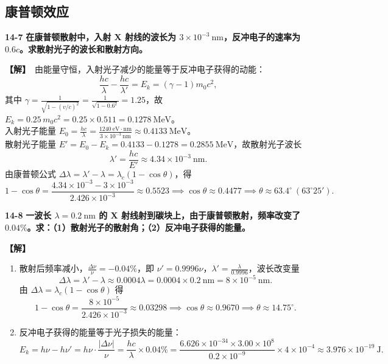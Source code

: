 \documentclass[zihao=5,a4paper,UTF8]{ctexart}
\newenvironment{prob}[2]{%
    \par\vspace{6pt}\noindent\textbf{\color{navy}#1} \textbf{#2}\par\nopagebreak\vspace{2pt}%
}{%
    \par\vspace{4pt}%
}
\newcommand{\sol}{\noindent\textbf{\color{tealaccent}【解】}\ }
\begin{document}
\subsection{康普顿效应}

\begin{prob}{14-7}{在康普顿散射中，入射 X 射线的波长为 $3\times 10^{-3}\ \mathrm{nm}$，反冲电子的速率为 $0.6c$。求散射光子的波长和散射方向。}
\sol 由能量守恒，入射光子减少的能量等于反冲电子获得的动能：
\[
    \frac{hc}{\lambda} - \frac{hc}{\lambda'} = E_k = (\gamma - 1)m_0 c^2,
\]
其中 $\gamma = \frac{1}{\sqrt{1 - (v/c)^2}} = \frac{1}{\sqrt{1 - 0.6^2}} = 1.25$，故 $E_k = 0.25\,m_0 c^2 = 0.25\times 0.511 = 0.1278\ \mathrm{MeV}$。\\
入射光子能量 $E_0 = \frac{hc}{\lambda} = \frac{1240\ \mathrm{eV\cdot nm}}{3\times 10^{-3}\ \mathrm{nm}} \approx 0.4133\ \mathrm{MeV}$。\\
散射光子能量 $E' = E_0 - E_k = 0.4133 - 0.1278 = 0.2855\ \mathrm{MeV}$，故散射光子波长
\[
    \lambda' = \frac{hc}{E'} \approx 4.34\times 10^{-3}\ \mathrm{nm}.
\]
由康普顿公式 $\Delta\lambda = \lambda' - \lambda = \lambda_c(1 - \cos\theta)$，得
\[
    1 - \cos\theta = \frac{4.34\times 10^{-3} - 3\times 10^{-3}}{2.426\times 10^{-3}} \approx 0.5523 \implies \cos\theta \approx 0.4477 \implies \theta \approx 63.4^\circ\ (63^\circ 25').
\]
\end{prob}

\begin{prob}{14-8}{一波长 $\lambda=0.2\ \mathrm{nm}$ 的 X 射线射到碳块上，由于康普顿散射，频率改变了 $0.04\%$。求：（1）散射光子的散射角；（2）反冲电子获得的能量。}
\sol
\begin{enumerate}[leftmargin=2em, itemsep=2pt]
    \item 散射后频率减小，$\frac{\Delta\nu}{\nu} = -0.04\%$，即 $\nu' = 0.9996\nu$，$\lambda' = \frac{\lambda}{0.9996}$，波长改变量
    \[
        \Delta\lambda = \lambda' - \lambda \approx 0.0004\lambda = 0.0004\times 0.2\ \mathrm{nm} = 8\times 10^{-5}\ \mathrm{nm}.
    \]
    由 $\Delta\lambda = \lambda_c(1 - \cos\theta)$ 得
    \[
        1 - \cos\theta = \frac{8\times 10^{-5}}{2.426\times 10^{-3}} \approx 0.03298 \implies \cos\theta \approx 0.9670 \implies \theta \approx 14.75^\circ.
    \]
    \item 反冲电子获得的能量等于光子损失的能量：
    \[
        E_k = h\nu - h\nu' = h\nu\cdot\frac{|\Delta\nu|}{\nu} = \frac{hc}{\lambda}\times 0.04\% = \frac{6.626\times 10^{-34}\times 3.00\times 10^8}{0.2\times 10^{-9}}\times 4\times 10^{-4} \approx 3.976\times 10^{-19}\ \mathrm{J}.
    \]
\end{enumerate}
\end{prob}
\end{document}

